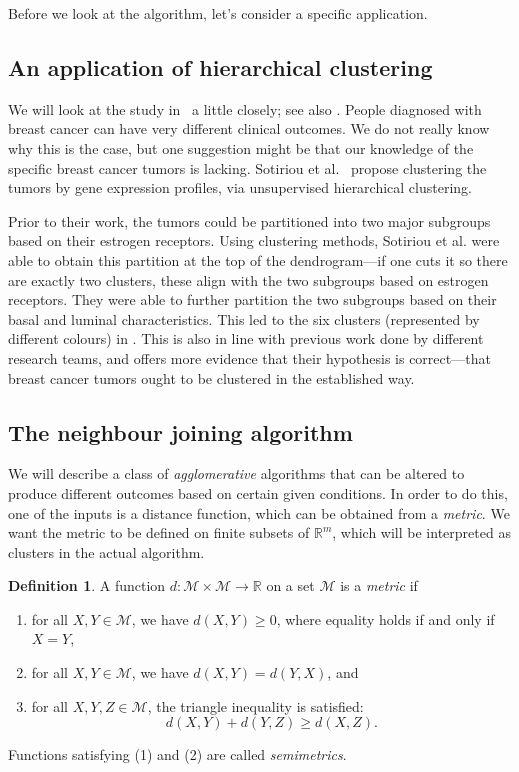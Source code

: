 \documentclass[a4paper, 12pt]{article}
\numberwithin{equation}{section}
\numberwithin{figure}{section}
\theoremstyle{definition}
\newtheorem{defn}[thm]{Definition}
\renewcommand{\geq}{\geqslant}
\newcommand{\R}{\mathbb{R}}
\begin{document}
Before we look at the algorithm, let's consider a specific application.

\subsection{An application of hierarchical clustering}

We will look at the study in~\cite{BreastCancer} a little closely; see also
. People diagnosed with breast cancer can have very
different clinical outcomes. We do not really know why this is the case, but one
suggestion might be that our knowledge of the specific breast cancer tumors is
lacking. Sotiriou et al.~\cite{BreastCancer} propose clustering the tumors by
gene expression profiles, via unsupervised hierarchical clustering. 

Prior to their work, the tumors could be partitioned into two major subgroups
based on their estrogen receptors. Using clustering methods, Sotiriou et al.
were able to obtain this partition at the top of the dendrogram---if one cuts it
so there are exactly two clusters, these align with the two subgroups based on
estrogen receptors. They were able to further partition the two subgroups based
on their basal and luminal characteristics. This led to the six clusters
(represented by different colours) in . This is also
in line with previous work done by different research teams, and offers more
evidence that their hypothesis is correct---that breast cancer tumors ought to
be clustered in the established way.

\subsection{The neighbour joining algorithm}

We will describe a class of \emph{agglomerative} algorithms that can be altered
to produce different outcomes based on certain given conditions. In order to do
this, one of the inputs is a distance function, which can be obtained from a
\emph{metric}. We want the metric to be defined on finite subsets of $\R^m$,
which will be interpreted as clusters in the actual algorithm. 

\begin{defn}
	A function $d: \mathscr{M}\times \mathscr{M} \to \R$ on a set $\mathscr{M}$
	is a \emph{metric} if 
	\begin{enumerate}
		\item for all $X, Y\in \mathscr{M}$, we have $d(X, Y) \geq 0$, where
		equality holds if and only if $X=Y$,
		\item for all $X, Y\in\mathscr{M}$, we have $d(X, Y) = d(Y, X)$, and
		\item for all $X, Y, Z\in\mathscr{M}$, the triangle inequality is
		satisfied:
		\[ 
			d(X, Y) + d(Y, Z) \geq d(X, Z). 
		\] 
	\end{enumerate}
	Functions satisfying (1) and (2) are called \emph{semimetrics}. 
\end{defn}
\end{document}
